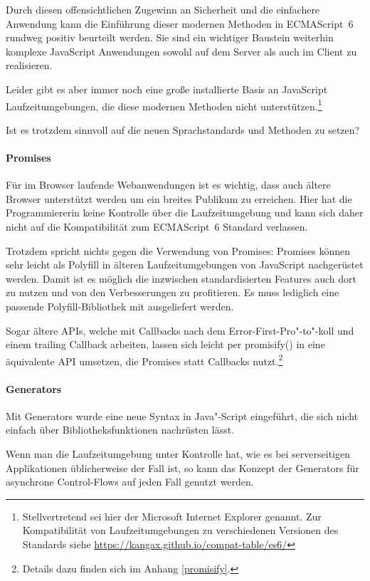 \documentclass[
11pt, %
a4paper, %
oneside, %
pdfspacing, %
headinclude,
BCOR5mm, %
ngerman, %
bibtotocnumbered,
]{scrartcl}
\begin{document}
	Durch diesen offensichtlichen Zugewinn an Sicherheit und die einfachere Anwendung kann die Einführung dieser modernen Methoden in ECMAScript~6 rundweg positiv beurteilt werden. Sie sind ein wichtiger Baustein weiterhin komplexe JavaScript Anwendungen sowohl auf dem Server als auch im Client zu realisieren.
	
	Leider gibt es aber immer noch eine große installierte Basis an JavaScript Laufzeitumgebungen, die diese modernen Methoden nicht unterstützen.\footnote{Stellvertretend sei hier der Microsoft Internet Explorer genannt. Zur Kompatibilität von Laufzeitumgebungen zu verschiedenen Versionen des Standards siehe \url{https://kangax.github.io/compat-table/es6/}}

	Ist es trotzdem sinnvoll auf die neuen Sprachstandards und Methoden zu setzen?
	

	\paragraph{Promises} Für im Browser laufende Webanwendungen ist es wichtig, dass auch ältere Browser unterstützt werden um ein breites Publikum zu erreichen.
	Hier hat die Programmiererin keine Kontrolle über die Laufzeitumgebung und kann sich daher nicht auf die Kompatibilität zum ECMAScript~6 Standard verlassen.
	
	Trotzdem spricht nichts gegen die Verwendung von Promises: Promises können sehr leicht als Polyfill in älteren Laufzeitumgebungen von JavaScript nachgerüstet werden. Damit ist es möglich die inzwischen standardisierten Features auch dort zu nutzen und von den Verbesserungen zu profitieren. Es muss lediglich eine passende Polyfill-Bibliothek mit ausgeliefert werden. 
	
	Sogar ältere APIs, welche mit Callbacks nach dem Error-First-Pro"-to"-koll und einem trailing Callback arbeiten, lassen sich leicht per \textsf{promisify()} in eine äquivalente API umsetzen, die Promises statt Callbacks nutzt.\footnote{Details dazu finden sich im Anhang \ref{promisify}.}
	
	
	\paragraph{Generators} Mit Generators wurde eine neue Syntax in Java"-Script eingeführt, die sich nicht einfach über Bibliotheksfunktionen nachrüsten lässt. 
	
	Wenn man die Laufzeitumgebung unter Kontrolle hat, wie es bei serverseitigen Applikationen üblicherweise der Fall ist, so kann das Konzept der Generators für asynchrone Control-Flows auf jeden Fall genutzt werden. 
	
\end{document}
